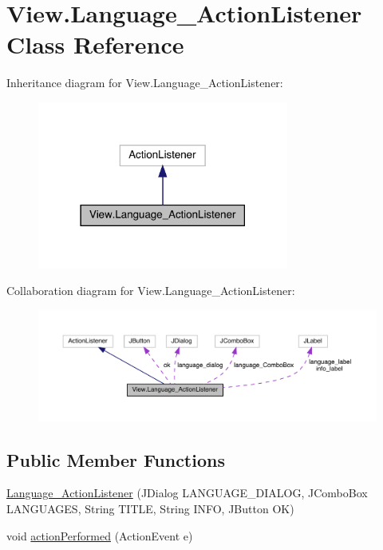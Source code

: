\hypertarget{class_view_1_1_language___action_listener}{}\section{View.\+Language\+\_\+\+Action\+Listener Class Reference}
\label{class_view_1_1_language___action_listener}


Inheritance diagram for View.\+Language\+\_\+\+Action\+Listener\+:
\nopagebreak
\begin{figure}[H]
\begin{center}
\leavevmode
\includegraphics[width=234pt]{class_view_1_1_language___action_listener__inherit__graph}
\end{center}
\end{figure}


Collaboration diagram for View.\+Language\+\_\+\+Action\+Listener\+:
\nopagebreak
\begin{figure}[H]
\begin{center}
\leavevmode
\includegraphics[width=350pt]{class_view_1_1_language___action_listener__coll__graph}
\end{center}
\end{figure}
\subsection*{Public Member Functions}
\begin{DoxyCompactItemize}
\item 
\hyperlink{class_view_1_1_language___action_listener_aa6665d6520519b0656db1b6d52140ceb}{Language\+\_\+\+Action\+Listener} (J\+Dialog L\+A\+N\+G\+U\+A\+G\+E\+\_\+\+D\+I\+A\+L\+O\+G, J\+Combo\+Box L\+A\+N\+G\+U\+A\+G\+E\+S, String T\+I\+T\+L\+E, String I\+N\+F\+O, J\+Button O\+K)
\item 
void \hyperlink{class_view_1_1_language___action_listener_a2813dfa60589ad4ce31e5c31bdc50255}{action\+Performed} (Action\+Event e)
\end{DoxyCompactItemize}


